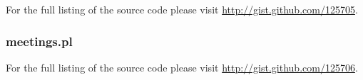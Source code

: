 For the full listing of the source code please visit \url{http://gist.github.com/125705}.



\subsubsection{meetings.pl}
\label{code:meetings}

For the full listing of the source code please visit \url{http://gist.github.com/125706}.


